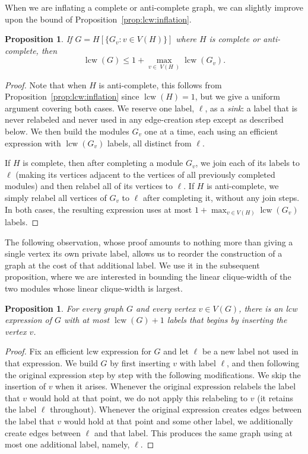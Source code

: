 \documentclass[10pt]{article}
\newcommand{\lcw}{\operatorname{lcw}}
\newcommand{\VH}{\;\!\!V\!(\!H\;\!\!)\!}
\theoremstyle{plain}
\newtheorem{proposition}[theorem]{Proposition}
\begin{document}
When we are inflating a complete or anti-complete graph, we can slightly improve upon the bound of Proposition~\ref{prop:lcw:inflation}.

\begin{proposition}
\label{prop:lcw:inflation:comp}
If $G=H[\{G_v : v\in V(H)\}]$ where $H$ is complete or anti-complete, then
\[
	\lcw(G)\le 1+\max_{v\in \VH} \lcw(G_v).
\]
\end{proposition}
\begin{proof}
Note that when $H$ is anti-complete, this follows from Proposition~\ref{prop:lcw:inflation} since $\lcw(H)=1$, but we give a uniform argument covering both cases. We reserve one label, $\ell$, as a \emph{sink}: a label that is never relabeled and never used in any edge-creation step except as described below. We then build the modules $G_v$ one at a time, each using an efficient expression with $\lcw(G_v)$ labels, all distinct from $\ell$.

If $H$ is complete, then after completing a module $G_v$, we join each of its labels to $\ell$ (making its vertices adjacent to the vertices of all previously completed modules) and then relabel all of its vertices to $\ell$. If $H$ is anti-complete, we simply relabel all vertices of $G_v$ to $\ell$ after completing it, without any join steps. In both cases, the resulting expression uses at most $1+\max_{v\in V(H)}\lcw(G_v)$ labels.
\end{proof}

The following observation, whose proof amounts to nothing more than giving a single vertex its own private label, allows us to reorder the construction of a graph at the cost of that additional label. We use it in the subsequent proposition, where we are interested in bounding the linear clique-width of the two modules whose linear clique-width is largest.

\begin{proposition}
\label{prop:lcw:reorder}
For every graph $G$ and every vertex $v\in V(G)$, there is an lcw expression of $G$ with at most $\lcw(G)+1$ labels that begins by inserting the vertex $v$.
\end{proposition}
\begin{proof}
Fix an efficient lcw expression for $G$ and let $\ell$ be a new label not used in that expression. We build $G$ by first inserting $v$ with label $\ell$, and then following the original expression step by step with the following modifications. We skip the insertion of $v$ when it arises. Whenever the original expression relabels the label that $v$ would hold at that point, we do not apply this relabeling to $v$ (it retains the label $\ell$ throughout). Whenever the original expression creates edges between the label that $v$ would hold at that point and some other label, we additionally create edges between $\ell$ and that label. This produces the same graph using at most one additional label, namely, $\ell$.
\end{proof}
\end{document}
